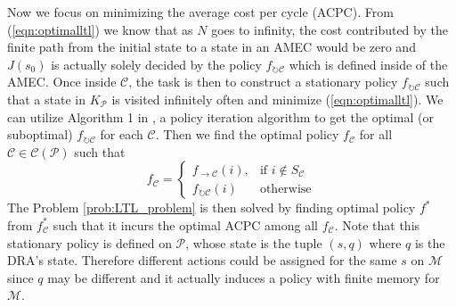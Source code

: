 \documentclass[journal]{IEEEtran}
\newtheorem{theorem}{Theorem}
\newtheorem{lemma}{Lemma}
\begin{document}
Now we focus on minimizing the average cost per cycle (ACPC). From (\ref{eqn:optimalltl}) we know that as $N$ goes to infinity, the cost contributed by the finite path from the initial state to a state in an AMEC would be zero and $J(s_0)$ is actually solely decided by the policy $f_{\circlearrowright\mathcal{C}}$ which is defined inside of the AMEC. Once inside $\mathcal{C}$, the task is then to construct a stationary policy $f_{\circlearrowright\mathcal{C}}$ such that a state in $K_{\mathcal{P}}$ is visited infinitely often and minimize (\ref{eqn:optimalltl}). We can utilize Algorithm 1 in \cite{ding2014optimal}, a policy iteration algorithm to get the optimal (or suboptimal) $f_{\circlearrowright\mathcal{C}}$ for each $\mathcal{C}$. Then we find the optimal policy $f_\mathcal{C}$ for all $\mathcal{C}\in\mathcal{C}(\mathcal{P})$ such that 
\[
f_\mathcal{C}= 
\begin{cases}
f_{\rightarrow\mathcal{C}}(i),& \text{if } i\notin S_\mathcal{C}\\
f_{\circlearrowright\mathcal{C}}(i)             & \text{otherwise}
\end{cases}
\]
The Problem \ref{prob:LTL_problem} is then solved by finding optimal policy $f^*$ from $f_\mathcal{C}^*$ such that it incurs the optimal ACPC among all $f_\mathcal{C}$. Note that this stationary policy is defined on $\mathcal{P}$, whose state is the tuple $(s,q)$ where $q$ is the DRA's state. Therefore different actions could be assigned for the same $s$ on $\mathcal{M}$ since $q$ may be different and it actually induces a policy with finite memory for $\mathcal{M}$. 




\end{document}
